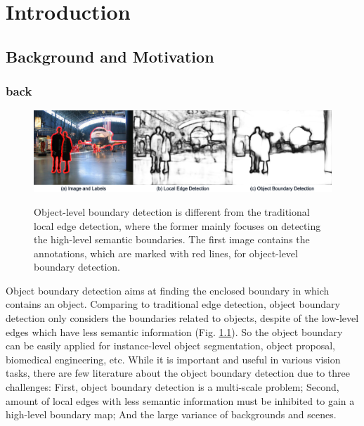 \documentclass[senior]{IPSstyle}
\begin{document}
 \makepreliminarypages
 \singlespace
 \frontmatter
 \tableofcontents
 \listoffigures
 \listoftables
 \mainmatter
 \clearemptydoublepage
 \setlength{\baselineskip}{23.0pt}

\chapter{Introduction} \label{introduction}



\section{Background and Motivation}
\subsection{back}
\begin{figure}[t]
  \centering
  \includegraphics[width=15cm]{object_boundary_vs_local_edge.png}\\
  \caption{Object-level boundary detection is different from the traditional local edge detection, where the former mainly focuses on detecting the high-level semantic boundaries. The first image contains the annotations, which are marked with red lines, for object-level boundary detection.}\label{object_boundary_vs_local_edge}
\end{figure}

Object boundary detection aims at finding the enclosed boundary in which contains an object. Comparing to traditional edge detection, object boundary detection only considers the boundaries related to objects, despite of the low-level edges which have less semantic information (Fig. \ref{object_boundary_vs_local_edge}). So the object boundary can be easily applied for instance-level object segmentation, object proposal\cite{Yang2016, Zitnick2014}, biomedical engineering\cite{Lee2015, Quan2016, Ronneberger2015}, etc. While it is important and useful in various vision tasks, there are few literature about the object boundary detection due to three challenges: First, object boundary detection is a multi-scale problem;  Second, amount of local edges with less semantic information must be inhibited to gain a high-level boundary map; And the large variance of backgrounds and scenes.
\end{document}

